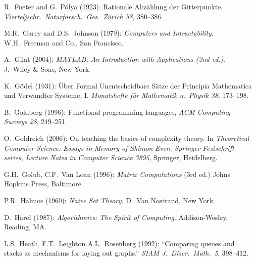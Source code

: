 \begin{thebibliography}{999}
R.~Fueter and G.~P\'{o}lya (1923):
Rationale Abz\"{a}hlung der Gitterpunkte.  {\it
Vierteljschr.~Naturforsch.~Ges.~Z\"{u}rich 58}, 380--386.


M.R.~Garey and D.S.~Johnson (1979):
{\it Computers and Intractability}.
W.H.~Freeman and Co., San Francisco.

A.~Gilat (2004):
{\it MATLAB: An Introduction with Applications (2nd ed.)}.
J.~Wiley \& Sons, New York.

K.~G\"{o}del (1931): \"{U}ber Formal Unentscheidbare S\"{a}tze der
Principia Mathematica und Verwandter Systeme, I.  {\it Monatshefte
f\"{u}r Mathematik u.~Physik 38}, 173--198.

B.~Goldberg (1996): Functional programming languages,  {\it ACM
  Computing Surveys 28}, 249--251.

O.~Goldreich (2006): On teaching the basics of complexity theory.  In
{\it Theoretical Computer Science: Essays in Memory of Shimon Even.}
{\it Springer Festschrift series, Lecture Notes in Computer Science
3895}, Springer, Heidelberg.

G.H.~Golub, C.F.~Van Loan (1996):
{\it Matrix Computations} (3rd ed.)
Johns Hopkins Press,  Baltimore.


P.R.~Halmos (1960):
{\it Naive Set Theory}.
D.~Van Nostrand, New York.

D.~Harel (1987): {\it Algorithmics: The Spirit of Computing}.
Addison-Wesley, Reading, MA.


L.S.~Heath, F.T.~Leighton A.L.~Rosenberg (1992): ``Comparing queues
and stacks as mechanisms for laying out graphs.''  {\it SIAM
  J.~Discr.~Math.~5}, 398--412.





\end{thebibliography}
